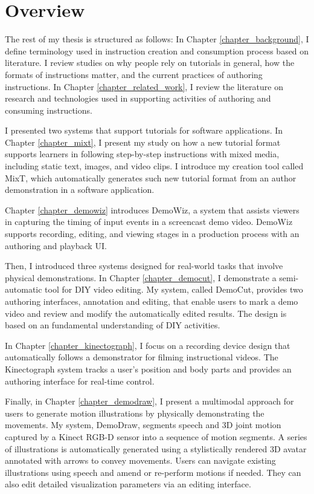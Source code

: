 
\section{Overview}

The rest of my thesis is structured as follows:
%
In Chapter \ref{chapter_background}, I define terminology used in instruction creation and consumption process based on literature. I review studies on why people rely on tutorials in general, how the formats of instructions matter, and the current practices of authoring instructions.
%
In Chapter \ref{chapter_related_work}, I review the literature on research and technologies used in supporting activities of authoring and consuming instructions.

I presented two systems that support tutorials for software applications.
In Chapter \ref{chapter_mixt}, I present my study on how a new tutorial format supports learners in following step-by-step instructions with mixed media, including static text, images, and video clips. I introduce my creation tool called MixT, which automatically generates such new tutorial format from an author demonstration in a software application.

Chapter \ref{chapter_demowiz} introduces DemoWiz, a system that assists viewers in capturing the timing of input events in a screencast demo video. DemoWiz supports recording, editing, and viewing stages in a production process with an authoring and playback UI.

Then, I introduced three systems designed for real-world tasks that involve physical demonstrations.
In Chapter \ref{chapter_democut}, I demonstrate a semi-automatic tool for DIY video editing. My system, called DemoCut, provides two authoring interfaces, annotation and editing, that enable users to mark a demo video and review and modify the automatically edited results. The design is based on an fundamental understanding of DIY activities.

In Chapter \ref{chapter_kinectograph}, I focus on a recording device design that automatically follows a demonstrator for filming instructional videos. The Kinectograph system tracks a user's position and body parts and provides an authoring interface for real-time control.

Finally, in Chapter \ref{chapter_demodraw}, I present a multimodal approach for users to generate motion illustrations by physically demonstrating the movements. My system, DemoDraw, segments speech and 3D joint motion captured by a Kinect RGB-D sensor into a sequence of motion segments. A series of illustrations is automatically generated using a stylistically rendered 3D avatar annotated with arrows to convey movements. Users can navigate existing illustrations using speech and amend or re-perform motions if needed. They can also edit detailed visualization parameters via an editing interface.

